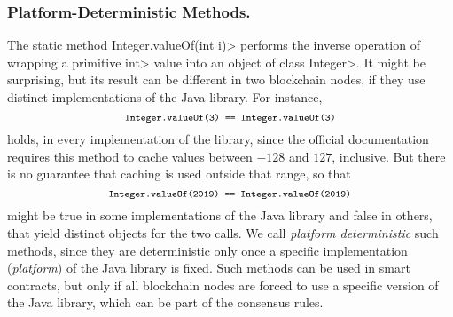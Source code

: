 \subsubsection*{Platform-Deterministic Methods.}
The static method \<Integer.valueOf(int i)> performs the inverse operation of wrapping
a primitive \<int> value into an object of class \<Integer>. It might be surprising,
but its result can be different in two blockchain nodes, if they
use distinct implementations of the Java library. For instance,
\[
\<Integer.valueOf(3) == Integer.valueOf(3)>
\]
holds, in every implementation of the library, since the official documentation requires this method
to cache values between $-128$ and $127$, inclusive. But there is no guarantee that caching is
used outside that range, so that
\[
\<Integer.valueOf(2019) == Integer.valueOf(2019)>
\]
might be true in some implementations of the Java library
and false in others, that yield distinct objects for the two calls.
We call \emph{platform deterministic} such methods, since they are deterministic only once a specific
implementation (\emph{platform}) of the Java library is fixed. Such methods can be used in smart contracts,
but only if all blockchain nodes are forced to
use a specific version of the Java library, which can be part of the consensus rules.

